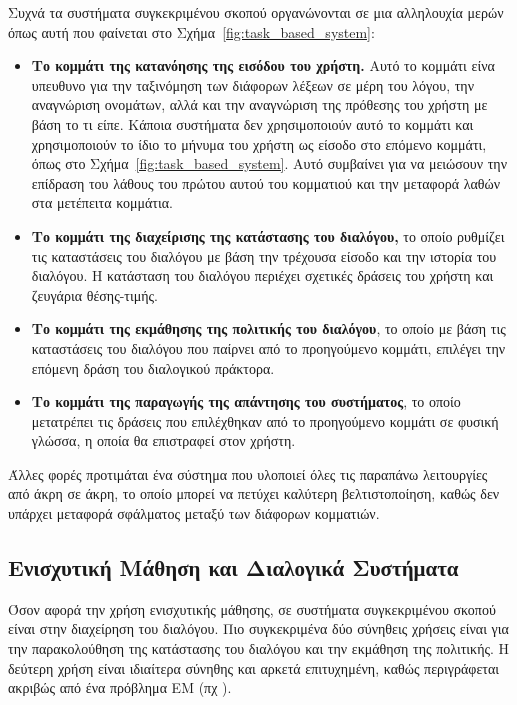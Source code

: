Συχνά τα συστήματα συγκεκριμένου σκοπού οργανώνονται σε μια αλληλουχία μερών όπως αυτή που φαίνεται στο Σχήμα~\ref{fig:task_based_system}:
\begin{itemize}
    \item \textbf{Το κομμάτι της κατανόησης της εισόδου του χρήστη.} Αυτό το κομμάτι είνα υπευθυνο για την ταξινόμηση των διάφορων λέξεων σε μέρη του λόγου, την αναγνώριση ονομάτων, αλλά και την αναγνώριση της πρόθεσης του χρήστη με βάση το τι είπε. Κάποια συστήματα δεν χρησιμοποιούν αυτό το κομμάτι και χρησιμοποιούν το ίδιο το μήνυμα του χρήστη ως είσοδο στο επόμενο κομμάτι, όπως στο Σχήμα~\ref{fig:task_based_system}. Αυτό συμβαίνει για να μειώσουν την επίδραση του λάθους του πρώτου αυτού του κομματιού και την μεταφορά λαθών στα μετέπειτα κομμάτια.
    \item \textbf{Το κομμάτι της διαχείρισης της κατάστασης του διαλόγου,} το οποίο ρυθμίζει τις καταστάσεις του διαλόγου με βάση την τρέχουσα είσοδο και την ιστορία του διαλόγου. Η κατάσταση του διαλόγου περιέχει σχετικές δράσεις του χρήστη και ζευγάρια θέσης-τιμής.
    \item \textbf{Το κομμάτι της εκμάθησης της πολιτικής του διαλόγου}, το οποίο με βάση τις καταστάσεις του διαλόγου που παίρνει από το προηγούμενο κομμάτι, επιλέγει την επόμενη δράση του διαλογικού πράκτορα.
    \item \textbf{Το κομμάτι της παραγωγής της απάντησης του συστήματος}, το οποίο μετατρέπει τις δράσεις που επιλέχθηκαν από το προηγούμενο κομμάτι σε φυσική γλώσσα, η οποία θα επιστραφεί στον χρήστη.
\end{itemize}

Άλλες φορές προτιμάται ένα σύστημα που υλοποιεί όλες τις παραπάνω λειτουργίες από άκρη σε άκρη, το οποίο μπορεί να πετύχει καλύτερη βελτιστοποίηση, καθώς δεν υπάρχει μεταφορά σφάλματος μεταξύ των διάφορων κομματιών.

\subsection{Ενισχυτική Μάθηση και Διαλογικά Συστήματα}

Όσον αφορά την χρήση ενισχυτικής μάθησης, σε συστήματα συγκεκριμένου σκοπού είναι στην διαχείρηση του διαλόγου. Πιο συγκεκριμένα δύο σύνηθεις χρήσεις είναι για την παρακολούθηση της κατάστασης του διαλόγου και την εκμάθηση της πολιτικής. Η δεύτερη χρήση είναι ιδιαίτερα σύνηθης και αρκετά επιτυχημένη, καθώς περιγράφεται ακριβώς από ένα πρόβλημα ΕΜ (πχ \cite{policy_learning_2019}).

